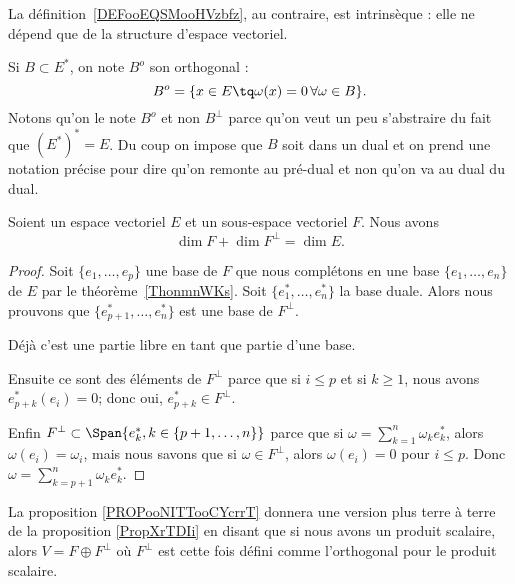La définition~\ref{DEFooEQSMooHVzbfz}, au contraire, est intrinsèque : elle ne dépend que de la structure d'espace vectoriel.

Si \( B\subset E^*\), on note \( B^o\) son orthogonal :
\begin{equation}
    B^o=\{ x\in E\tq \omega(x)=0\,\forall \omega\in B \}.
\end{equation}
Notons qu'on le note \( B^o\) et non \( B^{\perp}\) parce qu'on veut un peu s'abstraire du fait que \( (E^*)^*=E\). Du coup on impose que \( B\) soit dans un dual et on prend une notation précise pour dire qu'on remonte au pré-dual et non qu'on va au dual du dual.

\begin{proposition} \label{PropXrTDIi}
    Soient un espace vectoriel \( E\) et un sous-espace vectoriel \( F\). Nous avons
    \begin{equation}
        \dim F+\dim F^{\perp}=\dim E.
    \end{equation}
\end{proposition}

\begin{proof}
    Soit \( \{ e_1,\ldots, e_p \}\) une base de \( F\) que nous complétons en une base \( \{ e_1,\ldots, e_n \}\) de \( E\) par le théorème~\ref{ThonmnWKs}. Soit \( \{ e_1^*,\ldots, e^*_n \}\) la base duale. Alors nous prouvons que \( \{ e^*_{p+1},\ldots, e_n^* \}\) est une base de \( F^{\perp}\).

    Déjà c'est une partie libre en tant que partie d'une base.

    Ensuite ce sont des éléments de \( F^{\perp}\) parce que si \( i\leq p\) et si \( k\geq 1\), nous avons \( e^*_{p+k}(e_i)=0\); donc oui, \( e^*_{p+k}\in F^{\perp}\).

    Enfin \( F^{\perp}\subset\Span\{ e_{k}^*, k \in \{p+1, \dots, n\}\}\) parce que si \( \omega=\sum_{k=1}^n\omega_ke_k^*\), alors \( \omega(e_i)=\omega_i\), mais nous savons que si \( \omega\in F^{\perp}\), alors \( \omega(e_i)=0\) pour \( i\leq p\). Donc \( \omega=\sum_{k=p+1}^n\omega_ke^*_k\).
\end{proof}

La proposition \ref{PROPooNITTooCYcrrT} donnera une version plus terre à terre de la proposition \ref{PropXrTDIi} en disant que si nous avons un produit scalaire, alors \( V=F\oplus F^{\perp}\) où \( F^{\perp}\) est cette fois défini comme l'orthogonal pour le produit scalaire.

